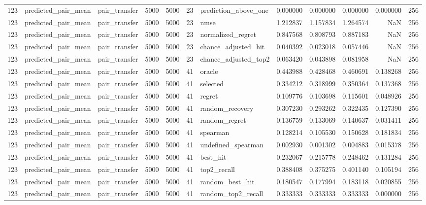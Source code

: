 \begin{tabular}{rllrrrlrrrrr}
123 & predicted_pair_mean & pair_transfer & 5000 & 5000 & 23 & prediction_above_one & 0.000000 & 0.000000 & 0.000000 & 0.000000 & 256 \\
123 & predicted_pair_mean & pair_transfer & 5000 & 5000 & 23 & nmse & 1.212837 & 1.157834 & 1.264574 & NaN & 256 \\
123 & predicted_pair_mean & pair_transfer & 5000 & 5000 & 23 & normalized_regret & 0.847568 & 0.808793 & 0.887183 & NaN & 256 \\
123 & predicted_pair_mean & pair_transfer & 5000 & 5000 & 23 & chance_adjusted_hit & 0.040392 & 0.023018 & 0.057446 & NaN & 256 \\
123 & predicted_pair_mean & pair_transfer & 5000 & 5000 & 23 & chance_adjusted_top2 & 0.063420 & 0.043898 & 0.081958 & NaN & 256 \\
123 & predicted_pair_mean & pair_transfer & 5000 & 5000 & 41 & oracle & 0.443988 & 0.428468 & 0.460691 & 0.138268 & 256 \\
123 & predicted_pair_mean & pair_transfer & 5000 & 5000 & 41 & selected & 0.334212 & 0.318999 & 0.350364 & 0.137368 & 256 \\
123 & predicted_pair_mean & pair_transfer & 5000 & 5000 & 41 & regret & 0.109776 & 0.103698 & 0.115601 & 0.048926 & 256 \\
123 & predicted_pair_mean & pair_transfer & 5000 & 5000 & 41 & random_recovery & 0.307230 & 0.293262 & 0.322435 & 0.127390 & 256 \\
123 & predicted_pair_mean & pair_transfer & 5000 & 5000 & 41 & random_regret & 0.136759 & 0.133069 & 0.140637 & 0.031411 & 256 \\
123 & predicted_pair_mean & pair_transfer & 5000 & 5000 & 41 & spearman & 0.128214 & 0.105530 & 0.150628 & 0.181834 & 256 \\
123 & predicted_pair_mean & pair_transfer & 5000 & 5000 & 41 & undefined_spearman & 0.002930 & 0.001302 & 0.004883 & 0.015378 & 256 \\
123 & predicted_pair_mean & pair_transfer & 5000 & 5000 & 41 & best_hit & 0.232067 & 0.215778 & 0.248462 & 0.131284 & 256 \\
123 & predicted_pair_mean & pair_transfer & 5000 & 5000 & 41 & top2_recall & 0.388408 & 0.375275 & 0.401140 & 0.105194 & 256 \\
123 & predicted_pair_mean & pair_transfer & 5000 & 5000 & 41 & random_best_hit & 0.180547 & 0.177994 & 0.183118 & 0.020855 & 256 \\
123 & predicted_pair_mean & pair_transfer & 5000 & 5000 & 41 & random_top2_recall & 0.333333 & 0.333333 & 0.333333 & 0.000000 & 256 \\

\end{tabular}
